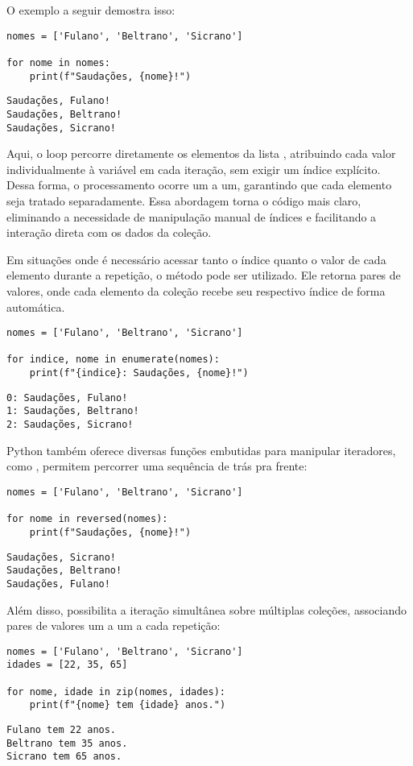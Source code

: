 O exemplo a seguir demostra isso:
\begin{verbatim}
nomes = ['Fulano', 'Beltrano', 'Sicrano']

for nome in nomes:
    print(f"Saudações, {nome}!")
\end{verbatim}
\begin{verbatim}
Saudações, Fulano!
Saudações, Beltrano!
Saudações, Sicrano!
\end{verbatim}



Aqui, o loop percorre diretamente os elementos da lista , atribuindo cada valor individualmente
à variável  em cada iteração, sem exigir um índice explícito.
Dessa forma, o processamento ocorre um a um, garantindo que cada elemento seja tratado separadamente.
Essa abordagem torna o código mais claro, eliminando a necessidade de manipulação manual de índices e
facilitando a interação direta com os dados da coleção.

Em situações onde é necessário acessar tanto o índice quanto o valor de cada elemento durante a repetição, o método  pode ser utilizado. Ele retorna pares de valores, onde cada elemento da coleção recebe seu respectivo índice de forma automática.
\begin{verbatim}
nomes = ['Fulano', 'Beltrano', 'Sicrano']

for indice, nome in enumerate(nomes):
    print(f"{indice}: Saudações, {nome}!")
\end{verbatim}
\begin{verbatim}
0: Saudações, Fulano!
1: Saudações, Beltrano!
2: Saudações, Sicrano!
\end{verbatim}

Python também oferece diversas funções embutidas para manipular iteradores, como ,
permitem percorrer uma sequência de trás pra frente:
\begin{verbatim}
nomes = ['Fulano', 'Beltrano', 'Sicrano']

for nome in reversed(nomes):
    print(f"Saudações, {nome}!")
\end{verbatim}
\begin{verbatim}
Saudações, Sicrano!
Saudações, Beltrano!
Saudações, Fulano!
\end{verbatim}

Além disso,  possibilita a iteração simultânea sobre múltiplas coleções, associando pares de valores
um a um a cada repetição:
\begin{verbatim}
nomes = ['Fulano', 'Beltrano', 'Sicrano']
idades = [22, 35, 65]

for nome, idade in zip(nomes, idades):
    print(f"{nome} tem {idade} anos.")
\end{verbatim}
\begin{verbatim}
Fulano tem 22 anos.
Beltrano tem 35 anos.
Sicrano tem 65 anos.
\end{verbatim}



